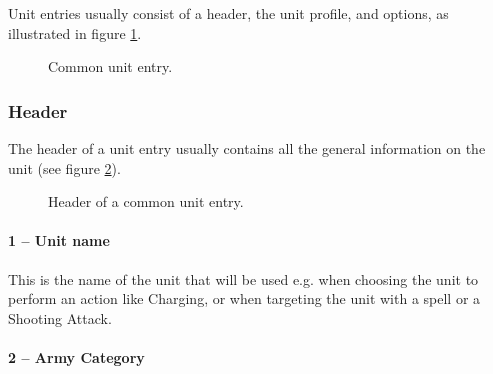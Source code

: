 Unit entries usually consist of a header, the unit profile, and options, as illustrated in figure \ref{figure/common_unit_entry}.

\newcommand{\tinmen}{Tin Men}
\newcommand{\tinman}{Tin Man}
\newcommand{\tinmansheart}{Tin Man's Heart}
\newcommand{\tinmansheartdef}{The model must reroll failed to-hit rolls against every enemy models with Fear.}
\newcommand{\figTINMENHeader}{Header}
\newcommand{\figTINMENUnitProfile}{Unit\\ Profile}
\newcommand{\figTINMENOptions}{Options}

\begin{figure}[H]
	
	\caption{Common unit entry.}
	\label{figure/common_unit_entry}
\end{figure}

\newpage
\subsubsection{Header}

The header of a unit entry usually contains all the general information on the unit (see figure \ref{figure/unit_entry_header}).

\newcommand{\figTMHOne}{1 -- Unit name}
\newcommand{\figTMHTwo}{2 -- Army Category}
\newcommand{\figTMHThree}{3 -- Unit size}
\newcommand{\figTMHFour}{4 -- Unit cost}
\newcommand{\figTMHFive}{5 -- Scoring}
\newcommand{\figTMHSix}{6 -- Unit cap}
\newcommand{\figTMHSeven}{7 -- Model specifications}

\begin{figure}[H]
	
	\caption{Header of a common unit entry.}
	\label{figure/unit_entry_header}
\end{figure}

\paragraph{1 -- Unit name}

This is the name of the unit that will be used e.g. when choosing the unit to perform an action like Charging, or when targeting the unit with a spell or a Shooting Attack.

\paragraph{2 -- Army Category}

